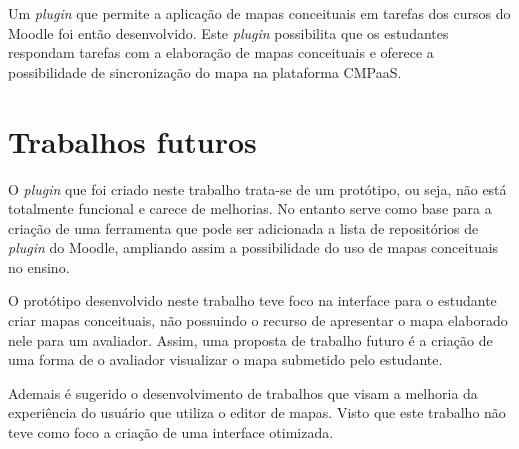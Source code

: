 \documentclass[
	12pt,				%
	openright,			%
	oneside,			%
	a4paper,			%
	english,			%
	french,				%
	spanish,			%
	brazil				%
	]{abntex2}
\begin{document}
Um \textit{plugin} que permite a aplicação de mapas conceituais em tarefas dos cursos do Moodle foi então desenvolvido. Este \textit{plugin} possibilita que os estudantes respondam tarefas com a elaboração de mapas conceituais e oferece a possibilidade de sincronização do mapa na plataforma CMPaaS. 
    

\section{Trabalhos futuros}


O \textit{plugin} que foi criado neste trabalho trata-se de um protótipo, ou seja, não está totalmente funcional e carece de melhorias. No entanto serve como base para a criação de uma ferramenta que pode ser adicionada a lista de repositórios de \textit{plugin} do Moodle, ampliando assim a possibilidade do uso de mapas conceituais no ensino.     

O protótipo desenvolvido neste trabalho teve foco na interface para o estudante criar mapas conceituais, não possuindo o recurso de apresentar o mapa elaborado nele para um avaliador. Assim, uma proposta de trabalho futuro é a criação de uma forma de o avaliador visualizar o mapa submetido pelo estudante.

Ademais é sugerido o desenvolvimento de trabalhos que visam a melhoria da experiência do usuário que utiliza o editor de mapas. Visto que este trabalho não teve como foco a criação de uma interface otimizada.

\postextual



%
%


\end{document}
